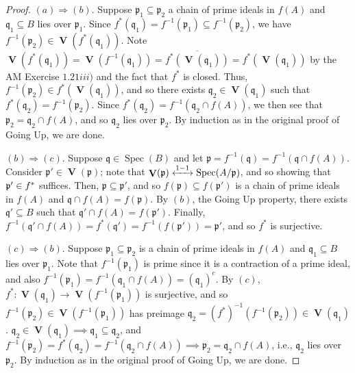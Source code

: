 \documentclass[12pt,letterpaper]{article}
\theoremstyle{definition}
\theoremstyle{remark}
\numberwithin{figure}{problem}
\numberwithin{equation}{section}
\let\Im\relax
\DeclareMathOperator{\Im}{Im}
\DeclareMathOperator{\Spec}{Spec}
\DeclareMathOperator{\V}{\mathbf{V}}
\begin{document}
\begin{proof}
  $(a) \Rightarrow (b)$. Suppose $\mathfrak{p}_1 \subseteq \mathfrak{p}_2$ a chain of prime ideals in $f(A)$ and $\mathfrak{q}_1 \subseteq B$ lies over $\mathfrak{p}_1$. Since $f^*(\mathfrak{q}_1) = f^{-1}(\mathfrak{p}_1) \subseteq f^{-1}(\mathfrak{p}_2)$, we have $f^{-1}(\mathfrak{p}_2) \in \V(f^*(\mathfrak{q}_1))$. Note $\V(f^*(\mathfrak{q}_1)) = \V(f^{-1}(\mathfrak{q}_1)) = \overline{f^*(\V(\mathfrak{q}_1))} = f^*(\V(\mathfrak{q}_1))$ by the AM Exercise $1.21iii)$ and the fact that $f^*$ is closed. Thus, $f^{-1}(\mathfrak{p}_2) \in f^*(\V(\mathfrak{q}_1))$, and so there exists $\mathfrak{q}_2 \in \V(\mathfrak{q}_1)$ such that $f^*(\mathfrak{q}_2) = f^{-1}(\mathfrak{p}_2)$. Since $f^*(\mathfrak{q}_2) = f^{-1}(\mathfrak{q}_2 \cap f(A))$, we then see that $\mathfrak{p}_2 = \mathfrak{q}_2 \cap f(A)$, and so $\mathfrak{q}_2$ lies over $\mathfrak{p}_2$. By induction as in the original proof of Going Up, we are done.
  \par $(b) \Rightarrow (c)$. Suppose $\mathfrak{q} \in \Spec(B)$ and let $\mathfrak{p} = f^{-1}(\mathfrak{q}) = f^{-1}(\mathfrak{q} \cap f(A))$. Consider $\mathfrak{p}' \in \V(\mathfrak{p})$; note that $\V(\mathfrak{p}) \xleftrightarrow{1-1\:} \Spec(A/\mathfrak{p})$, and so showing that $\mathfrak{p}' \in \Im f^*$ suffices. Then, $\mathfrak{p} \subseteq \mathfrak{p}'$, and so $f(\mathfrak{p}) \subseteq f(\mathfrak{p}')$ is a chain of prime ideals in $f(A)$ and $\mathfrak{q} \cap f(A) = f(\mathfrak{p})$. By $(b)$, the Going Up property, there exists $\mathfrak{q}' \subseteq B$ such that $\mathfrak{q}' \cap f(A) = f(\mathfrak{p}')$. Finally, $f^{-1}(\mathfrak{q}' \cap f(A)) = f^*(\mathfrak{q}') = f^{-1}(f(\mathfrak{p}')) = \mathfrak{p}'$, and so $f^*$ is surjective.
  \par $(c) \Rightarrow (b)$. Suppose $\mathfrak{p}_1 \subseteq \mathfrak{p}_2$ is a chain of prime ideals in $f(A)$ and $\mathfrak{q}_1 \subseteq B$ lies over $\mathfrak{p}_1$. Note that $f^{-1}(\mathfrak{p}_1)$ is prime since it is a contraction of a prime ideal, and also $f^{-1}(\mathfrak{p}_1) = f^{-1}(\mathfrak{q}_1 \cap f(A)) = (\mathfrak{q}_1)^c$. By $(c)$, $f^* : \V(\mathfrak{q}_1) \to \V(f^{-1}(\mathfrak{p}_1))$ is surjective, and so $f^{-1}(\mathfrak{p}_2) \in \V(f^{-1}(\mathfrak{p}_1))$ has preimage $\mathfrak{q}_2 = (f^*)^{-1}(f^{-1}(\mathfrak{p}_2)) \in \V(\mathfrak{q}_1)$. $\mathfrak{q}_2 \in \V(\mathfrak{q}_1) \implies \mathfrak{q}_1 \subseteq \mathfrak{q}_2$, and $f^{-1}(\mathfrak{p}_2) = f^*(\mathfrak{q}_2) = f^{-1}(\mathfrak{q}_2 \cap f(A)) \implies \mathfrak{p}_2 = \mathfrak{q}_2 \cap f(A)$, i.e., $\mathfrak{q}_2$ lies over $\mathfrak{p}_2$. By induction as in the original proof of Going Up, we are done.
\end{proof}
\end{document}
